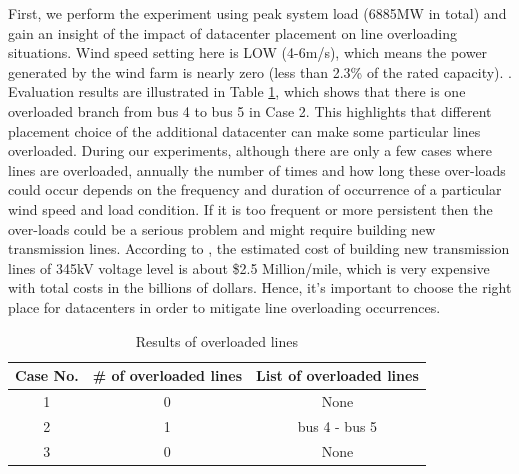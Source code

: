 First, we perform the experiment using peak system load (6885MW in total) and gain an insight of the impact of datacenter placement on line overloading situations. Wind speed setting here is LOW (4-6m/s), which means the power generated by the wind farm is nearly zero (less than 2.3\% of the rated capacity). . Evaluation results are illustrated in Table \ref{tab:results-linevio}, which shows that there is one overloaded branch from bus 4 to bus 5 in Case 2. This highlights that different placement choice of the additional datacenter can make some particular lines overloaded. During our experiments, although there are only a few cases where lines are overloaded, annually the number of times and how long these over-loads could occur depends on the frequency and duration of occurrence of a particular wind speed and load condition. If it is too frequent or more persistent then the over-loads could be a serious problem and might require building new transmission lines. According to \cite{interconnection2010survey}, the estimated cost of building new transmission lines of 345kV voltage level is about \$2.5 Million/mile, which is very expensive with total costs in the billions of dollars. Hence, it's important to choose the right place for datacenters in order to mitigate line overloading occurrences.


\begin{table}[ht]
\begin{center}
\caption{Results of overloaded lines}
\begin{tabular}{|c|c|c|}
\hline
Case No. & \# of overloaded lines & List of overloaded lines \\
\hline
1 & 0 & None\\
2 & 1 &  bus 4 - bus 5 \\
3 & 0 & None \\

\hline

\end{tabular}
\label{tab:results-linevio}
\end{center}
\end{table}

